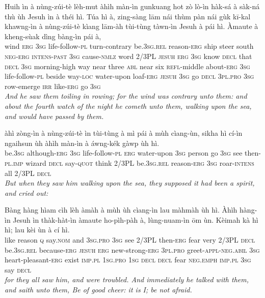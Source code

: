 \documentclass[11pt,a4paper]{article}
\begin{document}
\begin{exe}
\gll Huih ìn à nùng-zúi-tè lèh-mut àhìh màn-ìn gunkuang hot zò lò-ìn hàk-sá à sàk-ná thù ùh Jesuh ìn à théi hì. Túa hì à, zing-sàng lām nái thùm pàn nái gùk kī-kal khawng-ìn à nùng-zúi-tè kìang lām-àh tùi-tùng tàwn-ìn Jesuh à pái hì. Àmaute à kheng-sùak dìng bàng-ìn pái à, \\
     wind \textsc{erg} \textsc{3sg} life-follow-\textsc{pl} turn-contrary be.\textsc{3sg}.\textsc{rel} reason-\textsc{erg} ship steer south \textsc{neg}-\textsc{erg} \textsc{intens}-\textsc{past} \textsc{3sg} cause-\textsc{nmlz} word 2/3PL \textsc{jesuh} \textsc{erg} \textsc{3sg} know \textsc{decl} that \textsc{decl} \textsc{3sg} morning-high way near three \textsc{abl} near six \textsc{refl}-middle about-\textsc{erg} \textsc{3sg} life-follow-\textsc{pl} beside way-\textsc{loc} water-upon loaf-\textsc{erg} \textsc{jesuh} \textsc{3sg} go \textsc{decl} \textsc{3pl}.\textsc{pro} \textsc{3sg} row-emerge \textsc{irr} like-\textsc{erg} go \textsc{3sg} \\
\glt \textcolor{kjvcolor}{\textit{And he saw them toiling in rowing; for the wind was contrary unto them: and about the fourth watch of the night he cometh unto them, walking upon the sea, and would have passed by them.}}

\gll àhì zòng-ìn à nùng-zúi-tè ìn tùi-tùng à mì pái à mùh cìang-ùn, sikha hì cí-ìn ngaihsun ùh àhìh màn-ìn à áwng-kék gàwp ùh hì. \\
     be.\textsc{3sg} although-\textsc{erg} \textsc{3sg} life-follow-\textsc{pl} \textsc{erg} water-upon \textsc{3sg} person go \textsc{3sg} see then-\textsc{pl}.\textsc{imp} wizard \textsc{decl} say-\textsc{quot} think 2/3PL be.\textsc{3sg}.\textsc{rel} reason-\textsc{erg} \textsc{3sg} roar-\textsc{intens} all 2/3PL \textsc{decl} \\
\glt \textcolor{kjvcolor}{\textit{But when they saw him walking upon the sea, they supposed it had been a spirit, and cried out:}}

\gll Bàng hàng hìam cìh lèh àmàh à mùh ùh cìang-ìn lau màhmàh ùh hì. Àhìh hàng-ìn Jesuh ìn thàk-hàt-ìn àmaute ho-pìh-pàh à, lùng-nuam-ìn ōm ùn. Kèimah kà hì hì; lau kèi ùn à cí hì. \\
     like reason \textsc{q} say.\textsc{nom} and \textsc{3sg}.\textsc{pro} \textsc{3sg} see 2/3PL then-\textsc{erg} fear very 2/3PL \textsc{decl} be.\textsc{3sg}.\textsc{rel} because-\textsc{erg} \textsc{jesuh} \textsc{erg} new-strong-\textsc{erg} \textsc{3pl}.\textsc{pro} greet-\textsc{appl}-\textsc{neg}.\textsc{abil} \textsc{3sg} heart-pleasant-\textsc{erg} exist \textsc{imp}.\textsc{pl} \textsc{1sg}.\textsc{pro} \textsc{1sg} \textsc{decl} \textsc{decl} fear \textsc{neg}.\textsc{emph} \textsc{imp}.\textsc{pl} \textsc{3sg} say \textsc{decl} \\
\glt \textcolor{kjvcolor}{\textit{for they all saw him, and were troubled. And immediately he talked with them, and saith unto them, Be of good cheer: it is I; be not afraid.}}


\end{exe}
\end{document}
